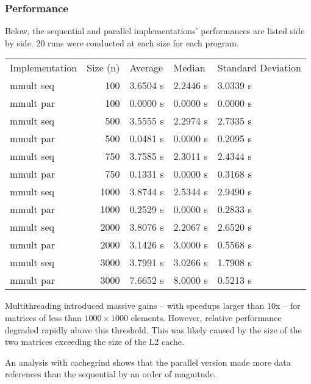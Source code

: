 \documentclass{article}
\begin{document}
\subsubsection{Performance}
Below, the sequential and parallel implementations' performances are
listed side by side. 20 runs were conducted at each size for each program.
\begin{center}
\begin{tabular}{lrlll}
 Implementation  &  Size (n)  &  Average   &  Median    &  Standard Deviation  \\
 mmult seq       &       100  &  3.6504 s  &  2.2446 s  &  3.0339 s            \\
 mmult par       &       100  &  0.0000 s  &  0.0000 s  &  0.0000 s            \\
 mmult seq       &       500  &  3.5555 s  &  2.2974 s  &  2.7335 s            \\
 mmult par       &       500  &  0.0481 s  &  0.0000 s  &  0.2095 s            \\
 mmult seq       &       750  &  3.7585 s  &  2.3011 s  &  2.4344 s            \\
 mmult par       &       750  &  0.1331 s  &  0.0000 s  &  0.3168 s            \\
 mmult seq       &      1000  &  3.8744 s  &  2.5344 s  &  2.9490 s            \\
 mmult par       &      1000  &  0.2529 s  &  0.0000 s  &  0.2833 s            \\
 mmult seq       &      2000  &  3.8076 s  &  2.2067 s  &  2.6520 s            \\
 mmult par       &      2000  &  3.1426 s  &  3.0000 s  &  0.5568 s            \\
 mmult seq       &      3000  &  3.7991 s  &  3.0266 s  &  1.7908 s            \\
 mmult par       &      3000  &  7.6652 s  &  8.0000 s  &  0.5213 s            \\
\end{tabular}
\end{center}

Multithreading introduced massive gains -- with speedups larger than
10x -- for matrices of less than $1000 \times 1000$ elements. However, relative
performance degraded rapidly above this threshold. This was likely
caused by the size of the two matrices exceeding the size of the L2
cache. 


An analysis with cachegrind shows that the parallel version made
more data references than the sequential by an order of magnitude.
\end{document}

